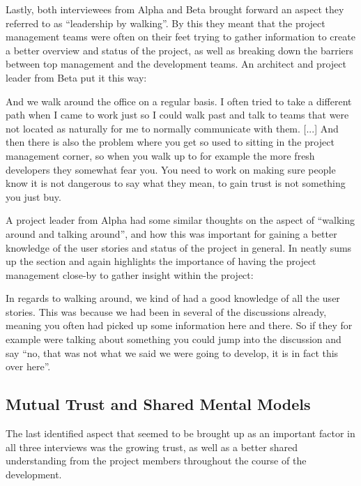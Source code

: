Lastly, both interviewees from Alpha and Beta brought forward an aspect they referred to as ``leadership by walking''. By this they meant that the project management teams were often on their feet trying to gather information to create a better overview and status of the project, as well as breaking down the barriers between top management and the development teams. An architect and project leader from Beta put it this way:

\begin{fancyquotes}
And we walk around the office on a regular basis. I often tried to take a different path when I came to work just so I could walk past and talk to teams that were not located as naturally for me to normally communicate with them. [...] And then there is also the problem where you get so used to sitting in the project management corner, so when you walk up to for example the more fresh developers they somewhat fear you. You need to work on making sure people know it is not dangerous to say what they mean, to gain trust is not something you just buy.
\end{fancyquotes}

A project leader from Alpha had some similar thoughts on the aspect of ``walking around and talking around'', and how this was important for gaining a better knowledge of the user stories and status of the project in general. In neatly sums up the section and again highlights the importance of having the project management close-by to gather insight within the project:

\begin{fancyquotes}
In regards to walking around, we kind of had a good knowledge of all the user stories. This was because we had been in several of the discussions already, meaning you often had picked up some information here and there. So if they for example were talking about something you could jump into the discussion and say ``no, that was not what we said we were going to develop, it is in fact this over here''.
\end{fancyquotes}

\subsection{Mutual Trust and Shared Mental Models}

The last identified aspect that seemed to be brought up as an important factor in all three interviews was the growing trust, as well as a better shared understanding from the project members throughout the course of the development.


